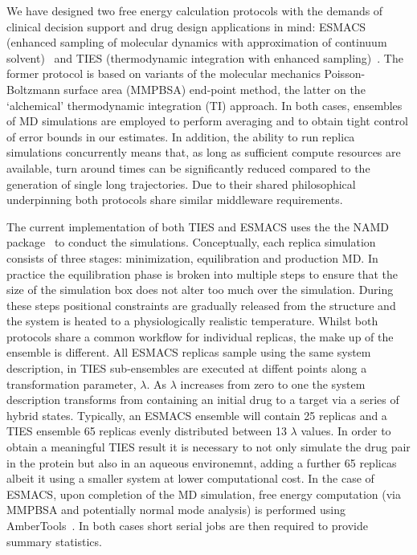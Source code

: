 We have designed two free energy calculation protocols with the demands of clinical
decision support and drug design applications in mind: ESMACS (enhanced
sampling of molecular dynamics with approximation of continuum
solvent)~\cite{Wan2017brd4} and TIES (thermodynamic integration with enhanced
sampling)~\cite{Bhati2017}. 
The former protocol is based on variants of the molecular mechanics Poisson-Boltzmann 
surface area (MMPBSA) end-point method, the latter on the `alchemical' thermodynamic 
integration (TI) approach. 
In both cases, ensembles of MD simulations are employed to perform averaging and
to obtain tight control of error bounds in our estimates. 
In addition, the ability to run replica simulations concurrently means that, as long as
sufficient compute resources are available, turn around times can be significantly 
reduced compared to the generation of single long trajectories.
Due to their shared philosophical underpinning both protocols share similar middleware 
requirements.

The current implementation of both TIES and ESMACS uses the the NAMD package~\cite{Phillips2005}
to conduct the simulations.
Conceptually, each replica simulation consists of three stages: minimization, equilibration 
and production MD.
In practice the equilibration phase is broken into multiple steps to ensure that the size of the 
simulation box does not alter too much over the simulation.
During these steps positional constraints are gradually released from the structure and the 
system is heated to a physiologically realistic temperature.
Whilst both protocols share a common workflow for individual replicas, the make up of the 
ensemble is different.
All ESMACS replicas sample using the same system description, in TIES sub-ensembles are executed 
at diffent points along a transformation parameter, $\lambda$.
As $\lambda$ increases from zero to one the system description transforms from containing an 
initial drug to a target via a series of hybrid states.
Typically, an ESMACS ensemble will contain 25 replicas and a TIES ensemble 65 replicas evenly 
distributed between 13 $\lambda$ values.
In order to obtain a meaningful TIES result it is necessary to not only simulate the drug pair 
in the protein but also in an aqueous environemnt, adding a further 65 replicas albeit it using a
smaller system at lower computational cost.
In the case of ESMACS, upon completion of the MD simulation, free energy computation 
(via MMPBSA and potentially normal mode analysis) is performed using 
AmberTools~\cite{amber14, Case2005, MillerIII2012}.
In both cases short serial jobs are then required to provide summary statistics.

